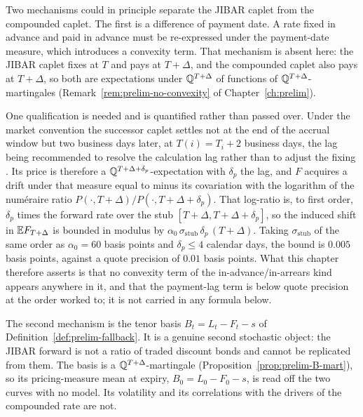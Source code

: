 \documentclass[../../../main.tex]{subfiles}
\begin{document}
Two mechanisms could in principle separate the JIBAR caplet from the compounded caplet. The first is a difference of payment date. A rate fixed in advance and paid in advance must be re-expressed under the payment-date measure, which introduces a convexity term. That mechanism is absent here: the JIBAR caplet fixes at $T$ and pays at $T+\Delta$, and the compounded caplet also pays at $T+\Delta$, so both are expectations under $\mathbb{Q}^{T+\Delta}$ of functions of $\mathbb{Q}^{T+\Delta}$-martingales (Remark~\ref{rem:prelim-no-convexity} of Chapter~\ref{ch:prelim}).

One qualification is needed and is quantified rather than passed over. Under the market convention the successor caplet settles not at the end of the accrual window but two business days later, at $T(i)=T_i+2$ business days, the lag being recommended to resolve the calculation lag rather than to adjust the fixing \citep[\S6.1, p.~8 and \S7.6, p.~24]{sarb2024conv}. Its price is therefore a $\mathbb{Q}^{T+\Delta+\delta_p}$-expectation with $\delta_p$ the lag, and $F$ acquires a drift under that measure equal to minus its covariation with the logarithm of the num\'eraire ratio $P(\cdot,T+\Delta)/P(\cdot,T+\Delta+\delta_p)$. That log-ratio is, to first order, $\delta_p$ times the forward rate over the stub $[T+\Delta,T+\Delta+\delta_p]$, so the induced shift in $\mathbb{E} F_{T+\Delta}$ is bounded in modulus by $\alpha_0\,\sigma_{\mathrm{stub}}\,\delta_p\,(T+\Delta)$. Taking $\sigma_{\mathrm{stub}}$ of the same order as $\alpha_0=60$ basis points and $\delta_p\le4$ calendar days, the bound is $0.005$ basis points, against a quote precision of $0.01$ basis points. What this chapter therefore asserts is that no convexity term of the in-advance/in-arrears kind appears anywhere in it, and that the payment-lag term is below quote precision at the order worked to; it is not carried in any formula below.

The second mechanism is the tenor basis $B_t=L_t-F_t-s$ of Definition~\ref{def:prelim-fallback}. It is a genuine second stochastic object: the JIBAR forward is not a ratio of traded discount bonds and cannot be replicated from them. The basis is a $\mathbb{Q}^{T+\Delta}$-martingale (Proposition~\ref{prop:prelim-B-mart}), so its pricing-measure mean at expiry, $B_0=L_0-F_0-s$, is read off the two curves with no model. Its volatility and its correlations with the drivers of the compounded rate are not.
\end{document}
